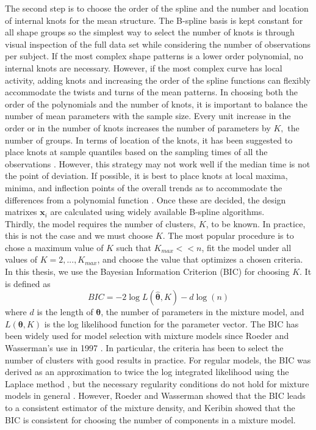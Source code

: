 \documentclass[12pt]{article}
\newcommand{\B}[0]{\mathbf}
\newcommand{\bs}[0]{\boldsymbol}
\begin{document}
The second step is to choose the order of the spline and the number and location of internal knots for the mean structure. The B-spline basis is kept constant for all shape groups so the simplest way to select the number of knots is through visual inspection of the full data set while considering the number of observations per subject. If the most complex shape patterns is a lower order polynomial, no internal knots are necessary. However, if the most complex curve has local activity, adding knots and increasing the order of the spline functions can flexibly accommodate the twists and turns of the mean patterns. In choosing both the order of the polynomials and the number of knots, it is important to balance the number of mean parameters with the sample size. Every unit increase in the order or in the number of knots increases the number of parameters by $K,$ the number of groups. In terms of location of the knots, it has been suggested to place knots at sample quantiles based on the sampling times of all the observations \cite{ruppert2002}. However, this strategy may not work well if the median time is not the point of deviation. If possible, it is best to place knots at local maxima, minima, and inflection points of the overall trends as to accommodate the differences from a polynomial function \cite{eubank1999}.  Once these are decided, the design matrixes $\B x_{i}$ are calculated using widely available B-spline algorithms. \\

Thirdly, the model requires the number of clusters, $K$, to be known. In practice, this is not the case and we must choose $K$. The most popular procedure is to chose a maximum value of $K$ such that $K_{max}<<n$, fit the model under all values of $K=2,...,K_{max}$, and choose the value that optimizes a chosen criteria. In this thesis, we use the Bayesian Information Criterion (BIC) \cite{schwarz1978} for choosing $K$. It is defined as
$$BIC = -2\log L(\hat{\bs\theta},K)- d\log(n)$$
where $d$ is the length of $\bs\theta$, the number of parameters in the mixture model, and $L(\bs\theta,K)$ is the log likelihood function for the parameter vector. The BIC has been widely used for model selection with mixture models since Roeder and Wasserman's use in 1997 \cite{roeder1997}. In particular, the criteria has been to select the number of clusters \cite{dasgupta1999,fraley1999} with good results in practice. For regular models, the BIC was derived as an approximation to twice the log integrated likelihood using the Laplace method \cite{tierney1986}, but the necessary regularity conditions do not hold for mixture models in general \cite{aitkin1985}. However, Roeder and Wasserman \cite{roeder1997} showed that the BIC leads to a consistent estimator of the mixture density, and Keribin \cite{keribin2000} showed that the BIC is consistent for choosing the number of components in a mixture model.\\
\end{document}
